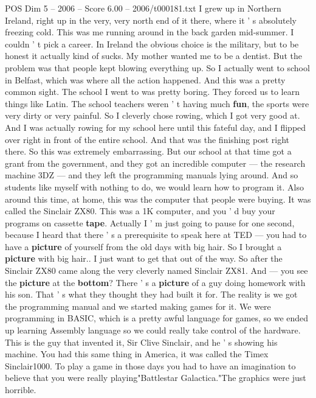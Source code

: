 \begin{textsample}{POS Dim 5 – 2006 – Score 6.00 – 2006/t000181.txt}  \label{ex:f5_pos_021}
I grew up in Northern Ireland, right up in the very, very north end of it there, where it ' s absolutely freezing cold.
This was me running around in the back garden mid-summer.
I couldn ' t pick a career.
In Ireland the obvious choice is the military, but to be honest it actually kind of sucks.
My mother wanted me to be a dentist.
But the problem was that people kept blowing everything up.
So I actually went to school in Belfast, which was where all the action happened.
And this was a pretty common sight.
The school I went to was pretty boring.
They forced us to learn things like Latin.
The school teachers weren ' t having much \textbf{fun}, the sports were very dirty or very painful.
So I cleverly chose rowing, which I got very good at.
And I was actually rowing for my school here until this fateful day, and I flipped over right in front of the entire school.
And that was the finishing post right there.
So this was extremely embarrassing.
But our school at that time got a grant from the government, and they got an incredible computer — the research machine 3DZ — and they left the programming manuals lying around.
And so students like myself with nothing to do, we would learn how to program it.
Also around this time, at home, this was the computer that people were buying.
It was called the Sinclair ZX80.
This was a 1K computer, and you ' d buy your programs on cassette \textbf{tape}.
Actually I ' m just going to pause for one second, because I heard that there ' s a prerequisite to speak here at TED — you had to have a \textbf{picture} of yourself from the old days with big hair.
So I brought a \textbf{picture} with big hair..
I just want to get that out of the way.
So after the Sinclair ZX80 came along the very cleverly named Sinclair ZX81.
And — you see the \textbf{picture} at the \textbf{bottom}?
There ' s a \textbf{picture} of a guy doing homework with his son.
That ' s what they thought they had built it for.
The reality is we got the programming manual and we started making games for it.
We were programming in BASIC, which is a pretty awful language for games, so we ended up learning Assembly language so we could really take control of the hardware.
This is the guy that invented it, Sir Clive Sinclair, and he ' s showing his machine.
You had this same thing in America, it was called the Timex Sinclair1000.
To play a game in those days you had to have an imagination to believe that you were really playing"Battlestar Galactica."The graphics were just horrible.

\end{textsample}
